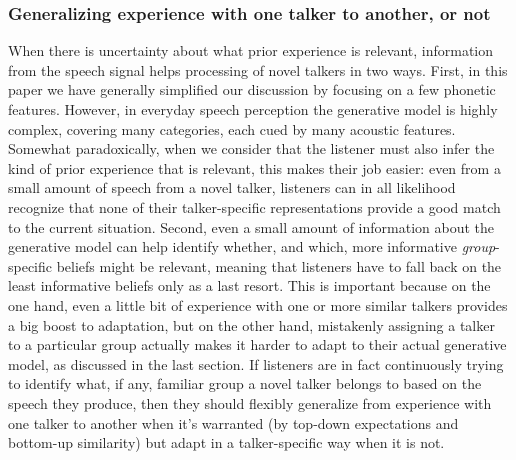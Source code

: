 \subsubsection{Generalizing experience with one talker to another, or not}
\label{sec:recogn-novel-talk}

When there is uncertainty about what prior experience is relevant, information from the speech signal helps processing of novel talkers in two ways.  First, in this paper we have generally simplified our discussion by focusing on a few phonetic features.  However, in everyday speech perception the generative model is highly complex, covering many categories, each cued by many acoustic features.  Somewhat paradoxically, when we consider that the listener must also infer the kind of prior experience that is relevant, this makes their job easier: even from a small amount of speech from a novel talker, listeners can in all likelihood recognize that none of their talker-specific representations provide a good match to the current situation.  Second, even a small amount of information about the generative model can help identify whether, and which, more informative \emph{group}-specific beliefs might be relevant, meaning that listeners have to fall back on the least informative beliefs only as a last resort.  This is important because on the one hand, even a little bit of experience with one or more similar talkers provides a big boost to adaptation, but on the other hand, mistakenly assigning a talker to a particular group actually makes it harder to adapt to their actual generative model, as discussed in the last section.  If listeners are in fact continuously trying to identify what, if any, familiar group a novel talker belongs to based on the speech they produce, then they should flexibly generalize from experience with one talker to another when it's warranted (by top-down expectations and bottom-up similarity) but adapt in a talker-specific way when it is not.


